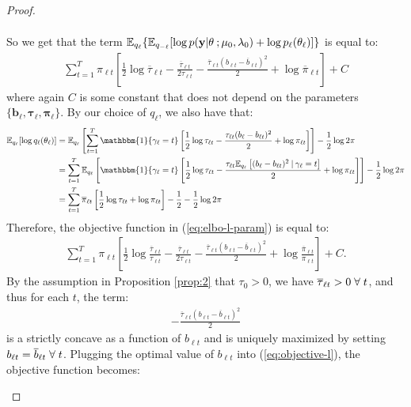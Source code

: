\begin{proof}
\begin{enumerate}[label=\roman*.]
\begin{align*}
\end{align*}
So we get that the term $\mathbb{E}_{q_\ell}\{\mathbb{E}_{q_{-\ell}}[\log p(\mathbf{y}| \theta\:; \mu_0,\lambda_0)+\log p_\ell(\theta_\ell)]\}$ is equal to:
\begin{align*}
    \sum_{t=1}^T \pi_{\ell t}\left[ \frac{1}{2}\log \overline{\tau}_{\ell t} - \frac{\overline{\tau}_{\ell t}}{2\tau_{\ell t}}- \frac{\overline{\tau}_{\ell t}(b_{\ell t}  - \overline{b}_{\ell t})^2}{2} + \log \overline{\pi}_{\ell t}\right] + C
\end{align*}
where again $C$ is some constant that does not depend on the parameters $\{\mathbf{b}_\ell, \pmb{\tau}_\ell, \pmb{\pi}_\ell\}$. By our choice of $q_\ell$, we also have that:
\begin{align*}
    \E_{q_\ell}[\log q_\ell(\theta_\ell)] &= \E_{q_\ell}\left[\sum_{t=1}^T \mathbbm{1}\{\gamma_\ell = t\}\left[\frac{1}{2}\log \tau_{\ell t} - \frac{\tau_{\ell t}(b_\ell - b_{\ell t})^2}{2} + \log \pi_{\ell t}\right]\right] - \frac{1}{2} \log 2\pi  \\
    &= \sum_{t=1}^T \E_{q_\ell}\left[\mathbbm{1}\{\gamma_\ell = t\}\left[\frac{1}{2}\log \tau_{\ell t} - \frac{\tau_{\ell t}\E_{q_\ell}\left[(b_\ell - b_{\ell t})^2\:|\: \gamma_{\ell} = t\right]}{2} + \log \pi_{\ell t}\right]\right] - \frac{1}{2} \log 2\pi  \\
    &= \sum_{t=1}^T \overline{\pi}_{\ell t}\left[\frac{1}{2}\log \tau_{\ell t} + \log \pi_{\ell t}\right] - \frac{1}{2} - \frac{1}{2} \log 2\pi 
\end{align*}
Therefore, the objective function in (\ref{eq:elbo-l-param}) is equal to:
\begin{align}
     \sum_{t=1}^T \pi_{\ell t}\left[ \frac{1}{2}\log \frac{\overline{\tau}_{\ell t}}{\tau_{\ell t}} - \frac{\overline{\tau}_{\ell t}}{2\tau_{\ell t}} - \frac{\overline{\tau}_{\ell t}(b_{\ell t}  - \overline{b}_{\ell t})^2}{2} + \log \frac{\overline{\pi}_{\ell t} }{\pi_{\ell t}}\right]+C.\label{eq:objective-l}
\end{align}
By the assumption in Proposition \ref{prop:2} that $\tau_{0} > 0$, we have $\overline{\tau}_{\ell t} > 0 \;\forall\; t$, and thus for each $t$, the term:
\begin{align*}
    - \frac{\overline{\tau}_{\ell t}(b_{\ell t}  - \overline{b}_{\ell t})^2}{2}
\end{align*}
is a strictly concave as a function of $b_{\ell t}$ and is uniquely maximized by setting $b_{\ell t} = \overline{b}_{\ell t} \;\forall\; t$. Plugging the optimal value of $b_{\ell t}$ into (\ref{eq:objective-l}), the objective function becomes: 

\end{enumerate}
\end{proof}
